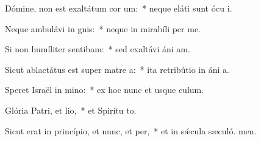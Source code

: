 \item Dómine, non est exaltátum cor um:~* neque eláti sunt ócu i.
\item Neque ambulávi in gnis:~* neque in mirabíli per me.
\item Si non humíliter sentibam:~* sed exaltávi áni am.
\item Sicut ablactátus est super matre a:~* ita retribútio in áni a.
\item Speret Israël in mino:~* ex hoc nunc et usque  culum.
\item Glória Patri, et lio,~* et Spirítu to.
\item Sicut erat in princípio, et nunc, et per,~* et in sǽcula sæculó. men.
